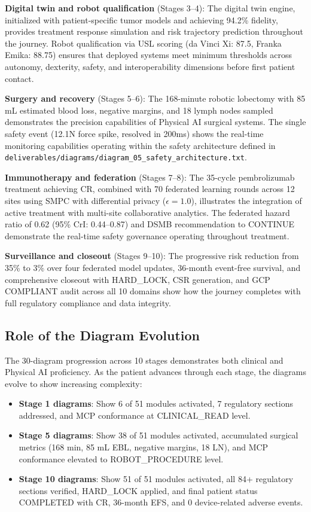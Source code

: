 \textbf{Digital twin and robot qualification} (Stages 3--4): The digital twin engine, initialized with patient-specific tumor models and achieving 94.2\% fidelity, provides treatment response simulation and risk trajectory prediction throughout the journey. Robot qualification via USL scoring (da Vinci Xi: 87.5, Franka Emika: 88.75) ensures that deployed systems meet minimum thresholds across autonomy, dexterity, safety, and interoperability dimensions before first patient contact.

\textbf{Surgery and recovery} (Stages 5--6): The 168-minute robotic lobectomy with 85 mL estimated blood loss, negative margins, and 18 lymph nodes sampled demonstrates the precision capabilities of Physical AI surgical systems. The single safety event (12.1N force spike, resolved in 200ms) shows the real-time monitoring capabilities operating within the safety architecture defined in \texttt{deliverables/diagrams/diagram\_05\_safety\_architecture.txt}.

\textbf{Immunotherapy and federation} (Stages 7--8): The 35-cycle pembrolizumab treatment achieving CR, combined with 70 federated learning rounds across 12 sites using SMPC with differential privacy ($\epsilon = 1.0$), illustrates the integration of active treatment with multi-site collaborative analytics. The federated hazard ratio of 0.62 (95\% CrI: 0.44--0.87) and DSMB recommendation to CONTINUE demonstrate the real-time safety governance operating throughout treatment.

\textbf{Surveillance and closeout} (Stages 9--10): The progressive risk reduction from 35\% to 3\% over four federated model updates, 36-month event-free survival, and comprehensive closeout with HARD\_LOCK, CSR generation, and GCP COMPLIANT audit across all 10 domains show how the journey completes with full regulatory compliance and data integrity.

\subsection{Role of the Diagram Evolution}

The 30-diagram progression across 10 stages demonstrates both clinical and Physical AI proficiency. As the patient advances through each stage, the diagrams evolve to show increasing complexity:

\begin{itemize}[leftmargin=*]
\item \textbf{Stage 1 diagrams}: Show 6 of 51 modules activated, 7 regulatory sections addressed, and MCP conformance at CLINICAL\_READ level.
\item \textbf{Stage 5 diagrams}: Show 38 of 51 modules activated, accumulated surgical metrics (168 min, 85 mL EBL, negative margins, 18 LN), and MCP conformance elevated to ROBOT\_PROCEDURE level.
\item \textbf{Stage 10 diagrams}: Show 51 of 51 modules activated, all 84+ regulatory sections verified, HARD\_LOCK applied, and final patient status COMPLETED with CR, 36-month EFS, and 0 device-related adverse events.
\end{itemize}

